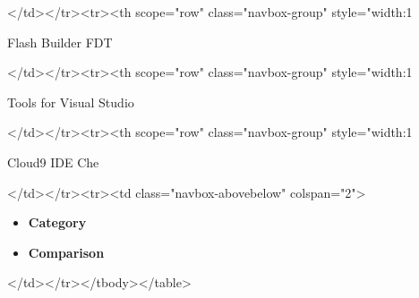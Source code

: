 \documentclass{article}\usepackage{titlesec}
\begin{document}
</td></tr><tr><th scope="row" class="navbox-group" style="width:1%
\begin{itemize}\itemAdobe Flash Builder
\itemFlashDevelop
\itemPowerflasher FDT\end{itemize}
</td></tr><tr><th scope="row" class="navbox-group" style="width:1%
\begin{itemize}\itemRStudio
\itemR Tools for Visual Studio\end{itemize}
</td></tr><tr><th scope="row" class="navbox-group" style="width:1%
\begin{itemize}\itemAWS Cloud9 IDE
\itemEclipse Che
\itemSourceLair\end{itemize}
</td></tr><tr><td class="navbox-abovebelow" colspan="2">
\begin{itemize}\item\textbf{Category}
\item\textbf{Comparison}\end{itemize}
</td></tr></tbody></table>
\end{document}
